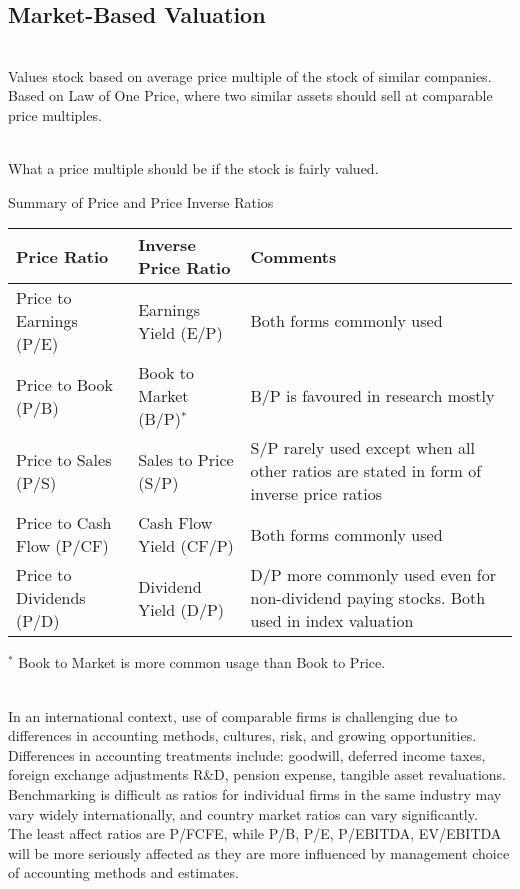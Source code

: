 \subsection{Market-Based Valuation}

\begin{definition} \\
Values stock based on average price multiple of the stock of similar companies.\\
Based on Law of One Price, where two similar assets should sell at comparable price multiples.
\end{definition}

\begin{definition} \\
What a price multiple should be if the stock is fairly valued.
\end{definition}

\begin{flushleft}
Summary of Price and Price Inverse Ratios
\begin{tabularx}{\textwidth}{p{12em}|p{11em}|X}
\hline
\rowcolor{gray!30}
Price Ratio & Inverse Price Ratio & Comments \\
\hline
Price to Earnings (P/E) & Earnings Yield (E/P) & Both forms commonly used \\
\hline
Price to Book (P/B) & Book to Market (B/P)$^{*}$ & B/P is favoured in research mostly \\
\hline
Price to Sales (P/S) & Sales to Price (S/P) & S/P rarely used except when all other ratios are stated in form of inverse price ratios \\
\hline
Price to Cash Flow (P/CF) & Cash Flow Yield (CF/P) & Both forms commonly used \\
\hline
Price to Dividends (P/D) & Dividend Yield (D/P) & D/P more commonly used even for non-dividend paying stocks. Both used in index valuation \\
\hline
\end{tabularx}
\end{flushleft}
$^{*}$ Book to Market is more common usage than Book to Price.

\begin{remark} \\
In an international context, use of comparable firms is challenging due to differences in accounting methods, cultures, risk, and growing opportunities.\\
Differences in accounting treatments include: goodwill, deferred income taxes, foreign exchange adjustments R\&D, pension expense, tangible asset revaluations.
Benchmarking is difficult as ratios for individual firms in the same industry may vary widely internationally, and country market ratios can vary significantly.\\ 
The least affect ratios are P/FCFE, while P/B, P/E, P/EBITDA, EV/EBITDA will be more seriously affected as they are more influenced by management choice of accounting methods and estimates.
\end{remark}

